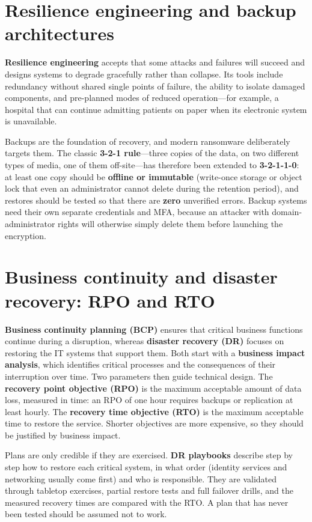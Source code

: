 \section{Resilience engineering and backup architectures}\label{sec:13.1}
\textbf{Resilience engineering} accepts that some attacks and failures will succeed and designs systems to degrade gracefully rather than collapse. Its tools include redundancy without shared single points of failure, the ability to isolate damaged components, and pre-planned modes of reduced operation—for example, a hospital that can continue admitting patients on paper when its electronic system is unavailable.

Backups are the foundation of recovery, and modern ransomware deliberately targets them. The classic \textbf{3-2-1 rule}—three copies of the data, on two different types of media, one of them off-site—has therefore been extended to \textbf{3-2-1-1-0}: at least one copy should be \textbf{offline or immutable} (write-once storage or object lock that even an administrator cannot delete during the retention period), and restores should be tested so that there are \textbf{zero} unverified errors. Backup systems need their own separate credentials and MFA, because an attacker with domain-administrator rights will otherwise simply delete them before launching the encryption.

\section{Business continuity and disaster recovery: RPO and RTO}\label{sec:13.2}
\textbf{Business continuity planning (BCP)} ensures that critical business functions continue during a disruption, whereas \textbf{disaster recovery (DR)} focuses on restoring the IT systems that support them. Both start with a \textbf{business impact analysis}, which identifies critical processes and the consequences of their interruption over time. Two parameters then guide technical design. The \textbf{recovery point objective (RPO)} is the maximum acceptable amount of data loss, measured in time: an RPO of one hour requires backups or replication at least hourly. The \textbf{recovery time objective (RTO)} is the maximum acceptable time to restore the service. Shorter objectives are more expensive, so they should be justified by business impact.

Plans are only credible if they are exercised. \textbf{DR playbooks} describe step by step how to restore each critical system, in what order (identity services and networking usually come first) and who is responsible. They are validated through tabletop exercises, partial restore tests and full failover drills, and the measured recovery times are compared with the RTO. A plan that has never been tested should be assumed not to work.

